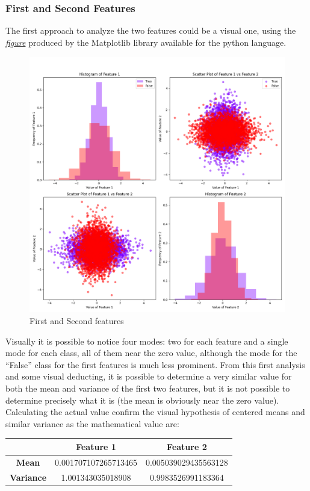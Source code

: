 \documentclass[a4paper, 12pt, english]{article}
\begin{document}
    \subsubsection{First and Second Features}
    \label{project1:1}
    The first approach to analyze the two features could be a visual one, using the \hyperref[fig:project1_1-2]{\textit{figure}} produced by the Matplotlib library \cite{Hunter:2007} available for the python language.
    \begin{figure}[H]
        \centering
        \includegraphics[width=0.7\linewidth]{img/projects/project1/1-2.png}
        \caption{First and Second features}
        \label{fig:project1_1-2}
    \end{figure}

    Visually it is possible to notice four modes: two for each feature and a single mode for each class, all of them near the zero value, although the mode for the “False” class for the first features is much less prominent. From this first analysis and some visual deducting, it is possible to determine a very similar value for both the mean and variance of the first two features, but it is not possible to determine precisely what it is (the mean is obviously near the zero value).
    Calculating the actual value confirm the visual hypothesis of centered means and similar variance as the mathematical value are:
    \begin{table}[htbp]
        \centering
        \begin{tabular}{|c|c|c|}
            \hline
            & \textbf{Feature 1}   & \textbf{Feature 2}   \\
            \hline
            \textbf{Mean}     & 0.001707107265713465 & 0.005039029435563128 \\
            \hline
            \textbf{Variance} & 1.001343035018908    & 0.9983526991183364   \\
            \hline
        \end{tabular}
    \end{table}
\end{document}
